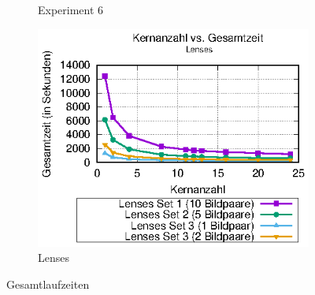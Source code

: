 \begin{center}
\begin{figure}[htbp]
\begin{subfigure}[b]{0.325\textwidth}
		\caption[Experiment 6]{Experiment 6}
		\label{fig:times_exp6}
	\end{subfigure}
	\hfill
	\begin{subfigure}[b]{0.325\textwidth}
		\centering
		\includegraphics[width=\textwidth]{pdf/times_lenses}
		\caption[Lenses]{Lenses}
		\label{fig:times_lenses}
	\end{subfigure}
	\caption{Gesamtlaufzeiten}
\end{figure}
\end{center}

